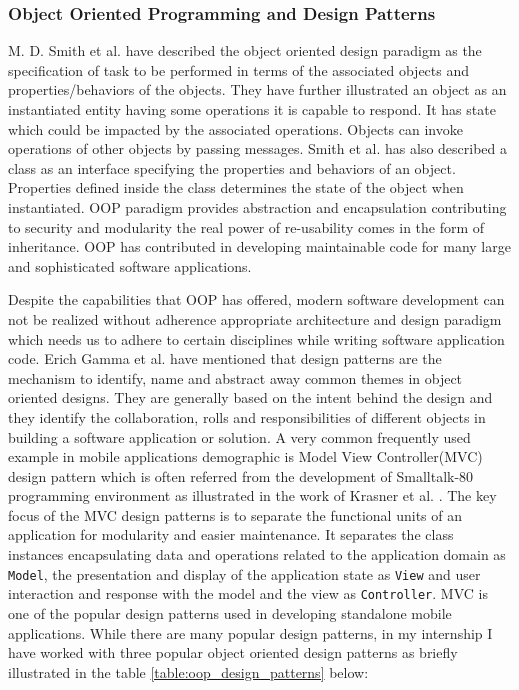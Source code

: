 \subsubsection{Object Oriented Programming and Design Patterns}
M. D. Smith et al. \cite{smith2011object} have described the object oriented design paradigm as the specification of task to be performed in terms of the associated objects and properties/behaviors of the objects. They have further illustrated an object as an instantiated entity having some operations it is capable to respond. It has state which could be impacted by the associated operations. Objects can invoke operations of other objects by passing messages. Smith et al. \cite{smith2011object} has also described a class as an interface specifying the properties and behaviors of an object. Properties defined inside the class determines the state of the object when instantiated. OOP paradigm provides abstraction and encapsulation contributing to security and modularity the real power of re-usability comes in the form of inheritance. OOP has contributed in developing maintainable code for many large and sophisticated software applications. 
\par Despite the capabilities that OOP has offered, modern software development can not be realized without adherence appropriate architecture and design paradigm which needs us to adhere to certain disciplines while writing software application code. Erich Gamma et al. \cite{gamma1995design}  have mentioned that design patterns are the mechanism to identify, name and abstract away common themes in object oriented designs. They are generally based on the intent behind the design and they identify the collaboration, rolls and responsibilities of different objects in building a software application or solution. A very common frequently used example in mobile applications demographic is Model View Controller(MVC) design pattern which is often referred from the development of  Smalltalk-80 programming environment as illustrated in the work of Krasner et al. \cite{krasner1988description}. The key focus of the MVC design patterns is to separate the functional units of an application for modularity and easier maintenance. It separates the class instances encapsulating data and operations related to the application domain as \texttt{Model}, the presentation and display of the application state as \texttt{View} and user interaction and response with the model and the view as \texttt{Controller}. MVC is one of the popular design patterns used in developing standalone mobile applications. While there are many popular design patterns, in my internship I have worked with three popular object oriented design patterns as briefly illustrated in the table \ref{table:oop_design_patterns} below:

